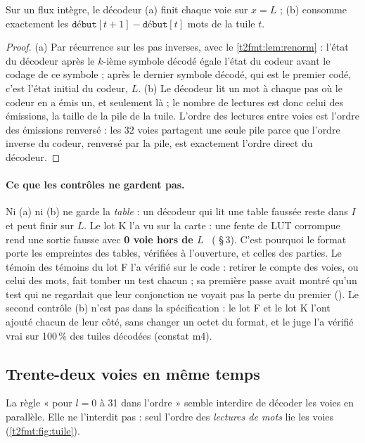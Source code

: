 \begin{proposition}\label{t2fmt:prop:controles}
Sur un flux intègre, le décodeur (a) finit chaque voie sur $x = L$ ; (b) consomme exactement les $\texttt{début}[t+1] - \texttt{début}[t]$ mots de la tuile $t$.
\end{proposition}
\begin{proof}
(a) Par récurrence sur les pas inverses, avec le \cref{t2fmt:lem:renorm} : l'état du décodeur après le $k$-ième symbole décodé égale l'état du codeur avant le codage de ce symbole ; après le dernier symbole décodé, qui est le premier codé, c'est l'état initial du codeur, $L$.
(b) Le décodeur lit un mot à chaque pas où le codeur en a émis un, et seulement là ; le nombre de lectures est donc celui des émissions, la taille de la pile de la tuile. L'ordre des lectures entre voies est l'ordre des émissions renversé : les 32 voies partagent une seule pile parce que l'ordre inverse du codeur, renversé par la pile, est exactement l'ordre direct du décodeur.
\end{proof}

\paragraph{Ce que les contrôles ne gardent pas.} Ni (a) ni (b) ne garde la \emph{table} : un décodeur qui lit une table faussée reste dans $I$ et peut finir sur $L$. Le lot K l'a vu sur la carte : une fente de LUT corrompue rend une sortie fausse avec \textbf{0 voie hors de $L$} \mes~( §\,3). C'est pourquoi le format porte les empreintes des tables, vérifiées à l'ouverture, et celles des parties. Le témoin des témoins du lot F l'a vérifié sur le code : retirer le compte des voies, ou celui des mots, fait tomber un test chacun ; sa première passe avait montré qu'un test qui ne regardait que leur conjonction ne voyait pas la perte du premier (). Le second contrôle (b) n'est pas dans la spécification : le lot F et le lot K l'ont ajouté chacun de leur côté, sans changer un octet du format, et le juge l'a vérifié vrai sur 100\,\% des tuiles décodées (constat m4).

\subsection{Trente-deux voies en même temps}

La règle « pour $l = 0$ à 31 dans l'ordre » semble interdire de décoder les voies en parallèle. Elle ne l'interdit pas : seul l'ordre des \emph{lectures de mots} lie les voies (\cref{t2fmt:fig:tuile}).

